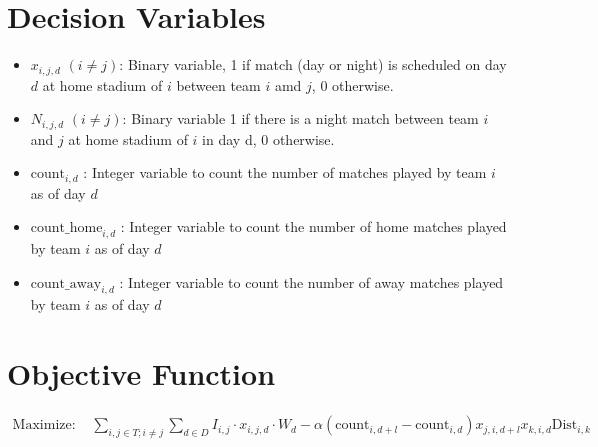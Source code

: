 \documentclass[a4paper, 12pt]{article}
\begin{document}
\section*{Decision Variables}
\begin{itemize}
    \item $x_{i,j,d}$ $(i \neq j)$: Binary variable, 1 if match (day or night) is scheduled on day $d$ at home stadium of $i$ between team $i$ amd $j$, 0 otherwise.
    \item $N_{i,j,d}$ $(i \neq j)$: Binary variable 1 if there is a night match between team $i$ and $j$ at home stadium of $i$ in day d, 0 otherwise.
    \item $\text{count}_{i,d}$ : Integer variable to count the number of matches played by team $i$ as of day $d$
    \item $\text{count\_home}_{i,d}$ : Integer variable to count the number of home matches played by team $i$ as of day $d$
    \item $\text{count\_away}_{i,d}$ : Integer variable to count the number of away matches played by team $i$ as of day $d$
    
\end{itemize}

\section*{Objective Function}
\begin{align*}
\text{Maximize: } & \sum_{i,j \in T; i \neq j} \sum_{d \in D} I_{i,j} \cdot x_{i,j,d} \cdot W_{d} - \alpha (\text{count}_{i,d+l} - \text{count}_{i,d})x_{j,i,d+l} x_{k,i,d}\text{Dist}_{i,k}
\end{align*}
\end{document}
